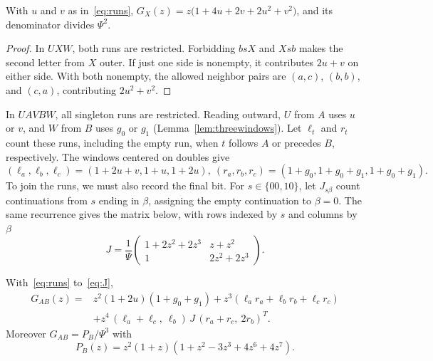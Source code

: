 \begin{proposition}\label{prop:GX}
With $u$ and $v$ as in~\eqref{eq:runs}, $G_X(z)=z\bigl(1+4u+2v+2u^2+v^2\bigr)$, and its
denominator divides $\Psi^2$.
\end{proposition}

\begin{proof}
In $UXW$, both runs are restricted. Forbidding $bsX$ and $Xsb$
makes the second letter from $X$ outer. If just one side is nonempty, it contributes
$2u+v$ on either side. With both nonempty, the allowed neighbor pairs are
$(a,c)$, $(b,b)$, and $(c,a)$, contributing $2u^2+v^2$.
\end{proof}

In $UAVBW$, all singleton runs are restricted. Reading outward,
$U$ from $A$ uses $u$ or $v$, and $W$ from $B$ uses $g_0$ or $g_1$
(Lemma~\ref{lem:threewindows}). Let $\ell_t$ and $r_t$ count these runs, including the empty run,
when $t$ follows $A$ or precedes $B$, respectively. The windows centered on doubles give
\begin{equation}\label{eq:lr}
(\ell_a,\ell_b,\ell_c)=(1+2u+v,1+u,1+2u),\ (r_a,r_b,r_c)=(1+g_0,1+g_0+g_1,1+g_0+g_1).
\end{equation}
To join the runs, we must also record the final bit. For $s\in\{00,10\}$, let $J_{s\beta}$
count continuations from $s$ ending in $\beta$, assigning the empty
continuation to $\beta=0$. The same recurrence gives the matrix below,
with rows indexed by $s$ and columns by $\beta$
\begin{equation}\label{eq:J}
J=\frac1\Psi\begin{pmatrix}1+2z^2+2z^3&z+z^2\\1&2z^2+2z^3\end{pmatrix}.
\end{equation}

\begin{proposition}\label{prop:GAB}
With~\eqref{eq:runs} to~\eqref{eq:J},
\begin{equation}\label{eq:GAB}
\begin{aligned}
G_{AB}(z)={}&z^2(1+2u)(1+g_0+g_1)+z^3(\ell_ar_a+\ell_br_b+\ell_cr_c)\\
&+z^4\,(\ell_a+\ell_c,\ \ell_b)\,J\,(r_a+r_c,\ 2r_b)^{T}.
\end{aligned}
\end{equation}
Moreover $G_{AB}=P_B/\Psi^3$ with
\begin{equation}\label{eq:PB}
P_B(z)=z^2(1+z)(1+z^2-3z^3+4z^6+4z^7).
\end{equation}
\end{proposition}

